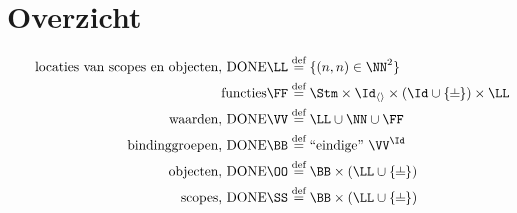 \section*{Overzicht}

\begin{align*}
  \tag*{locaties van scopes en objecten, DONE}
  \LL &\DEF \{ (n, n) \in \NN^2 \} \\
  \tag*{functies}
  \FF &\DEF \Stm \times \Id_{\langle\rangle} \times (\Id \cup \{\nil\}) \times \LL \\
  \tag*{waarden, DONE}
  \VV &\DEF \LL \cup \NN \cup \FF \\
  \tag*{bindinggroepen, DONE}
  \BB &\DEF \FiniteFunctions{\VV}{\Id} \\
  \tag*{objecten, DONE}
  \OO &\DEF \BB \times (\LL \cup \{\nil\}) \\
  \tag*{scopes, DONE}
  \SS &\DEF \BB \times (\LL \cup \{\nil\}) \\
\end{align*}

